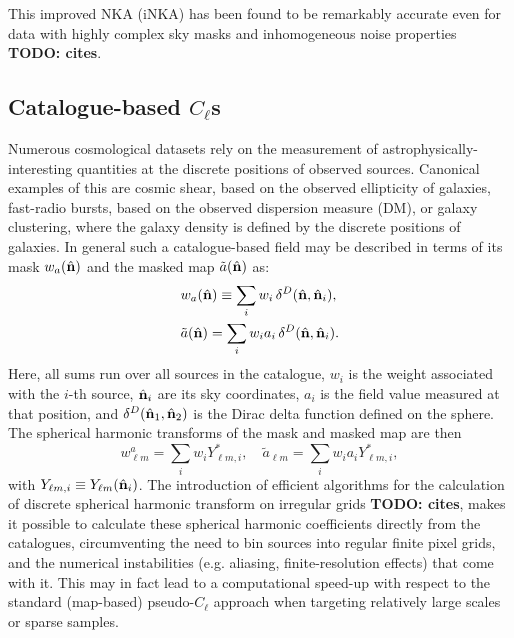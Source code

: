 \documentclass[aps,twocolumn, superscriptaddress, english, nofootinbib, 10pt]{revtex4-2}
\newcommand{\nv}{\hat{\bf n}}
\newcommand{\todo}[1]{{\color{blue}\bf TODO: #1}}
\begin{document}
    This improved NKA (iNKA) has been found to be remarkably accurate even for data with highly complex sky masks and inhomogeneous noise properties \todo{cites}.

  \subsection{Catalogue-based $C_\ell$s}\label{ssec:pcls.cat}
    Numerous cosmological datasets rely on the measurement of astrophysically-interesting quantities at the discrete positions of observed sources. Canonical examples of this are cosmic shear, based on the observed ellipticity of galaxies, fast-radio bursts, based on the observed dispersion measure (DM), or galaxy clustering, where the galaxy density is defined by the discrete positions of galaxies. In general such a catalogue-based field may be described in terms of its mask $w_a(\nv)$ and the masked map $\tilde{a}(\nv)$ as:
    \begin{align}\label{eq:mask_delta}
       &w_a(\nv)\equiv\sum_iw_i\,\delta^D(\nv,\nv_i),\\\label{eq:masked_cat_map}
       &\tilde{a}(\nv)=\sum_iw_ia_i\,\delta^D(\nv,\nv_i).
    \end{align}
    Here, all sums run over all sources in the catalogue, $w_i$ is the weight associated with the $i$-th source, $\nv_i$ are its sky coordinates, $a_i$ is the field value measured at that position, and $\delta^D(\nv_1,\nv_2)$ is the Dirac delta function defined on the sphere. The spherical harmonic transforms of the mask and masked map are then
    \begin{equation}
      w^a_{\ell m}=\sum_iw_i Y_{\ell m,i}^*,\hspace{12pt}
      \tilde{a}_{\ell m}=\sum_iw_ia_iY_{\ell m,i}^*,
    \end{equation}
    with $Y_{\ell m,i}\equiv Y_{\ell m}(\nv_i)$. The introduction of efficient algorithms for the calculation of discrete spherical harmonic transform on irregular grids \todo{cites}, makes it possible to calculate these spherical harmonic coefficients directly from the catalogues, circumventing the need to bin sources into regular finite pixel grids, and the numerical instabilities (e.g. aliasing, finite-resolution effects) that come with it. This may in fact lead to a computational speed-up with respect to the standard (map-based) pseudo-$C_\ell$ approach when targeting relatively large scales or sparse samples.
\end{document}
